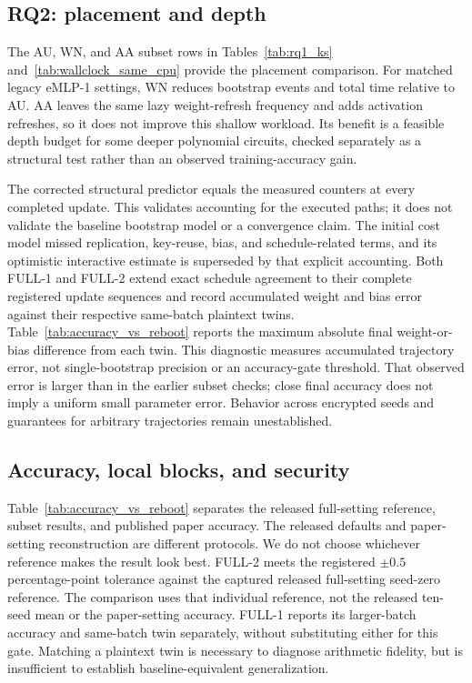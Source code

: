 \subsection{RQ2: placement and depth}
The AU, WN, and AA subset rows in Tables~\ref{tab:rq1_ks} and~\ref{tab:wallclock_same_cpu} provide the placement comparison. For matched legacy eMLP-1 settings, WN reduces bootstrap events and total time relative to AU. AA leaves the same lazy weight-refresh frequency and adds activation refreshes, so it does not improve this shallow workload. Its benefit is a feasible depth budget for some deeper polynomial circuits, checked separately as a structural test rather than an observed training-accuracy gain.

The corrected structural predictor equals the measured counters at every completed update. This validates accounting for the executed paths; it does not validate the baseline bootstrap model or a convergence claim. The initial cost model missed replication, key-reuse, bias, and schedule-related terms, and its optimistic interactive estimate is superseded by that explicit accounting. Both FULL-1 and FULL-2 extend exact schedule agreement to their complete registered update sequences and record accumulated weight and bias error against their respective same-batch plaintext twins. Table~\ref{tab:accuracy_vs_reboot} reports the maximum absolute final weight-or-bias difference from each twin. This diagnostic measures accumulated trajectory error, not single-bootstrap precision or an accuracy-gate threshold. That observed error is larger than in the earlier subset checks; close final accuracy does not imply a uniform small parameter error. Behavior across encrypted seeds and guarantees for arbitrary trajectories remain unestablished.

\subsection{Accuracy, local blocks, and security}



Table~\ref{tab:accuracy_vs_reboot} separates the released full-setting reference, subset results, and published paper accuracy. The released defaults and paper-setting reconstruction are different protocols. We do not choose whichever reference makes the result look best. FULL-2 meets the registered $\pm0.5$ percentage-point tolerance against the captured released full-setting seed-zero reference. The comparison uses that individual reference, not the released ten-seed mean or the paper-setting accuracy. FULL-1 reports its larger-batch accuracy and same-batch twin separately, without substituting either for this gate. Matching a plaintext twin is necessary to diagnose arithmetic fidelity, but is insufficient to establish baseline-equivalent generalization.

